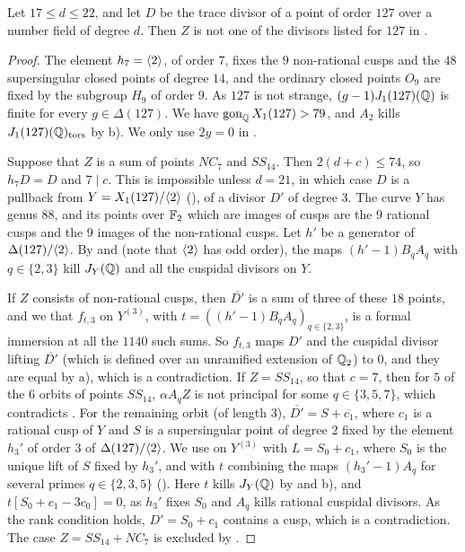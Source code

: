 \begin{proposition}\label{prop:127}
Let $17\leq d\leq 22$, and let $D$ be the trace divisor of a point of order $127$ over a number field of degree $d$. Then $Z$ is not one of the divisors listed for $127$ in .
\end{proposition}

\begin{proof}
The element $h_7=\langle 2\rangle$, of order $7$, fixes the $9$ non-rational cusps and the $48$ supersingular closed points of degree $14$, and the ordinary closed points $O_9$ are fixed by the subgroup $H_9$ of order $9$. As $127$ is not strange, $(g-1)J_1(127)(\mathbb{Q})$ is finite for every $g\in\Delta(127)$. We have $\operatorname{gon}_{\mathbb{Q}} X_1(127)>79$, and $A_2$ kills $J_1(127)(\mathbb{Q})_{\mathrm{tors}}$ by  b). We only use $2y=0$ in .

Suppose that $Z$ is a sum of points $NC_7$ and $SS_{14}$. Then $2(d+c)\leq 74$, so $h_7D=D$ and $7\mid c$. This is impossible unless $d=21$, in which case $D$ is a pullback from $Y=X_1(127)/\langle 2\rangle$ (), of a divisor $D'$ of degree $3$. The curve $Y$ has genus $88$, and its points over $\mathbb{F}_2$ which are images of cusps are the $9$ rational cusps and the $9$ images of the non-rational cusps. Let $h'$ be a generator of $\Delta(127)/\langle 2\rangle$. By  and  (note that $\langle 2\rangle$ has odd order), the maps $(h'-1)B_qA_q$ with $q\in\{2,3\}$ kill $J_Y(\mathbb{Q})$ and all the cuspidal divisors on $Y$.

If $Z$ consists of non-rational cusps, then $\overline{D'}$ is a sum of three of these $18$ points, and we  that $f_{t,3}$ on $Y^{(3)}$, with $t=((h'-1)B_qA_q)_{q\in\{2,3\}}$, is a formal immersion at all the $1140$ such sums. So $f_{t,3}$ maps $D'$ and the cuspidal divisor lifting $\overline{D'}$ (which is defined over an unramified extension of $\mathbb{Q}_2$) to $0$, and they are equal by  a), which is a contradiction. If $Z=SS_{14}$, so that $c=7$, then for $5$ of the $6$ orbits of points $SS_{14}$, $\alpha A_qZ$ is not principal for some $q\in\{3,5,7\}$, which contradicts . For the remaining orbit (of length $3$), $\overline{D'}=S+\overline{c_1}$, where $c_1$ is a rational cusp of $Y$ and $S$ is a supersingular point of degree $2$ fixed by the element $h_3'$ of order $3$ of $\Delta(127)/\langle 2\rangle$. We use  on $Y^{(3)}$ with $L=S_0+c_1$, where $S_0$ is the unique lift of $S$ fixed by $h_3'$, and with $t$ combining the maps $(h_3'-1)A_q$ for several primes $q\in\{2,3,5\}$ (). Here $t$ kills $J_Y(\mathbb{Q})$ by  and  b), and $t[S_0+c_1-3c_0]=0$, as $h_3'$ fixes $S_0$ and $A_q$ kills rational cuspidal divisors. As the rank condition holds, $D'=S_0+c_1$ contains a cusp, which is a contradiction. The case $Z=SS_{14}+NC_7$ is excluded by .


\end{proof}
